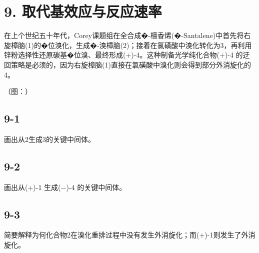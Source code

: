 \section*{9. 取代基效应与反应速率}
在上个世纪五⼗年代，Corey课题组在全合成�-檀⾹烯(�-Santalene)中⾸先将右旋樟脑(1)的�位溴化，⽣成�-溴樟脑(2)；接着在氯磺酸中溴化转化为3，再利⽤锌粉选择性还原碳基�位溴、最终形成(+)-4。这种制备光学纯化合物(+)-4 的迂回策略是必须的，因为右旋樟脑(1)直接在氯磺酸中溴化则会得到部分外消旋化的 4。

（图：）

\subsection*{9-1}
画出从2⽣成3的关键中间体。

\subsection*{9-2}
画出从(+)-1 ⽣成(−)-4 的关键中间体。

\subsection*{9-3}
简要解释为何化合物2在溴化重排过程中没有发⽣外消旋化；⽽(+)-1则发⽣了外消旋化。
